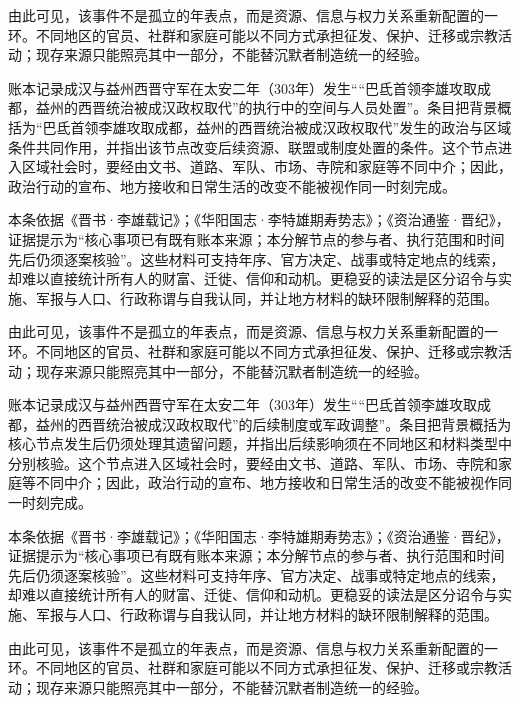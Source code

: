 由此可见，该事件不是孤立的年表点，而是资源、信息与权力关系重新配置的一环。不同地区的官员、社群和家庭可能以不同方式承担征发、保护、迁移或宗教活动；现存来源只能照亮其中一部分，不能替沉默者制造统一的经验。

账本记录成汉与益州西晋守军在太安二年（303年）发生““巴氐首领李雄攻取成都，益州的西晋统治被成汉政权取代”的执行中的空间与人员处置”。条目把背景概括为“巴氐首领李雄攻取成都，益州的西晋统治被成汉政权取代”发生的政治与区域条件共同作用，并指出该节点改变后续资源、联盟或制度处置的条件。这个节点进入区域社会时，要经由文书、道路、军队、市场、寺院和家庭等不同中介；因此，政治行动的宣布、地方接收和日常生活的改变不能被视作同一时刻完成。

本条依据《晋书·李雄载记》；《华阳国志·李特雄期寿势志》；《资治通鉴·晋纪》，证据提示为“核心事项已有既有账本来源；本分解节点的参与者、执行范围和时间先后仍须逐案核验”。这些材料可支持年序、官方决定、战事或特定地点的线索，却难以直接统计所有人的财富、迁徙、信仰和动机。更稳妥的读法是区分诏令与实施、军报与人口、行政称谓与自我认同，并让地方材料的缺环限制解释的范围。

由此可见，该事件不是孤立的年表点，而是资源、信息与权力关系重新配置的一环。不同地区的官员、社群和家庭可能以不同方式承担征发、保护、迁移或宗教活动；现存来源只能照亮其中一部分，不能替沉默者制造统一的经验。

账本记录成汉与益州西晋守军在太安二年（303年）发生““巴氐首领李雄攻取成都，益州的西晋统治被成汉政权取代”的后续制度或军政调整”。条目把背景概括为核心节点发生后仍须处理其遗留问题，并指出后续影响须在不同地区和材料类型中分别核验。这个节点进入区域社会时，要经由文书、道路、军队、市场、寺院和家庭等不同中介；因此，政治行动的宣布、地方接收和日常生活的改变不能被视作同一时刻完成。

本条依据《晋书·李雄载记》；《华阳国志·李特雄期寿势志》；《资治通鉴·晋纪》，证据提示为“核心事项已有既有账本来源；本分解节点的参与者、执行范围和时间先后仍须逐案核验”。这些材料可支持年序、官方决定、战事或特定地点的线索，却难以直接统计所有人的财富、迁徙、信仰和动机。更稳妥的读法是区分诏令与实施、军报与人口、行政称谓与自我认同，并让地方材料的缺环限制解释的范围。

由此可见，该事件不是孤立的年表点，而是资源、信息与权力关系重新配置的一环。不同地区的官员、社群和家庭可能以不同方式承担征发、保护、迁移或宗教活动；现存来源只能照亮其中一部分，不能替沉默者制造统一的经验。

